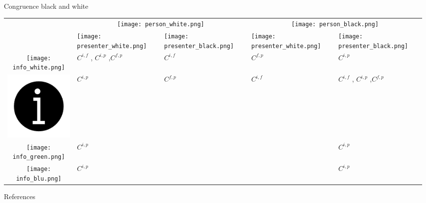 \documentclass[10pt]{beamer}
\begin{document}
\begin{frame}{Congruence black and white}
\label{congruence_table}
\begin{table}[]
\begin{tabular}{cm{2.1cm}m{2.1cm}m{2.1cm}m{2.1cm}}
                      & \multicolumn{2}{c}{\texttt{[image: person\_white.png]}}                          & \multicolumn{2}{c}{\texttt{[image: person\_black.png]}}                          \\
                      & \texttt{[image: presenter\_white.png]}    
                      &  \texttt{[image: presenter\_black.png]}        
                      & \texttt{[image: presenter\_white.png]}            &  \texttt{[image: presenter\_black.png]}                 \\ \cline{2-5} 
\texttt{[image: info\_white.png]} & \multicolumn{1}{|l|}{$C^{i,f}$ , $C^{i,p}$ ,$C^{f,p}$} & \multicolumn{1}{l|}{$C^{i,f}$} & \multicolumn{1}{l|}{$C^{f,p}$} & \multicolumn{1}{l|}{$C^{i,p}$} \\ \cline{2-5} 
\includegraphics[width=.07\textwidth]{info_black.png} & \multicolumn{1}{|l|}{$C^{i,p}$} & \multicolumn{1}{l|}{$C^{f,p}$} & \multicolumn{1}{l|}{$C^{i,f}$} & \multicolumn{1}{l|}{$C^{i,f}$ , $C^{i,p}$ ,$C^{f,p}$} \\ \cline{2-5} 
\texttt{[image: info\_green.png]} & \multicolumn{1}{|l|}{$C^{i,p}$} & \multicolumn{1}{l|}{} & \multicolumn{1}{l|}{} & \multicolumn{1}{l|}{$C^{i,p}$} \\ \cline{2-5} 
\texttt{[image: info\_blu.png]} & \multicolumn{1}{|l|}{$C^{i,p}$} & \multicolumn{1}{l|}{} & \multicolumn{1}{l|}{} & \multicolumn{1}{l|}{$C^{i,p}$} \\ \cline{2-5} 
\end{tabular}
\end{table}
\end{frame}

\begin{frame}[allowframebreaks]{References}

  
  

\end{frame}
\end{document}
